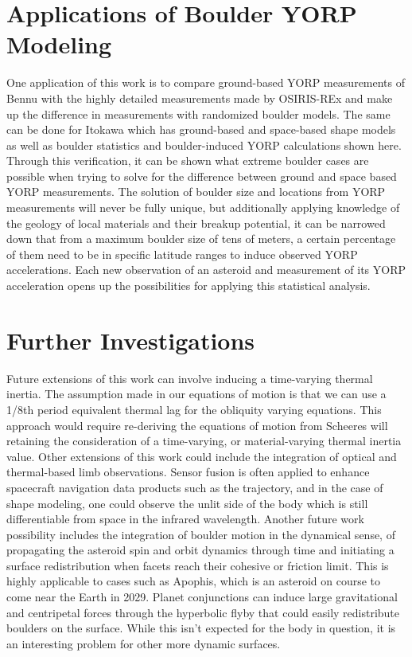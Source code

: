 \section{Applications of Boulder YORP Modeling}
One application of this work is to compare ground-based YORP measurements of Bennu with the highly detailed measurements made by OSIRIS-REx and make up the difference in measurements with randomized boulder models. The same can be done for Itokawa which has ground-based and space-based shape models as well as boulder statistics and boulder-induced YORP calculations shown here. Through this verification, it can be shown what extreme boulder cases are possible when trying to solve for the difference between ground and space based YORP measurements. The solution of boulder size and locations from YORP measurements will never be fully unique, but additionally applying knowledge of the geology of local materials and their breakup potential, it can be narrowed down that from a maximum boulder size of tens of meters, a certain percentage of them need to be in specific latitude ranges to induce observed YORP accelerations. Each new observation of an asteroid and measurement of its YORP acceleration opens up the possibilities for applying this statistical analysis.

\section{Further Investigations}
Future extensions of this work can involve inducing a time-varying thermal inertia. The assumption made in our equations of motion is that we can use a 1/8th period equivalent thermal lag for the obliquity varying equations. This approach would require re-deriving the equations of motion from Scheeres will retaining the consideration of a time-varying, or material-varying thermal inertia value.
Other extensions of this work could include the integration of optical and thermal-based limb observations. Sensor fusion is often applied to enhance spacecraft navigation data products such as the trajectory, and in the case of shape modeling, one could observe the unlit side of the body which is still differentiable from space in the infrared wavelength.
Another future work possibility includes the integration of boulder motion in the dynamical sense, of propagating the asteroid spin and orbit dynamics through time and initiating a surface redistribution when facets reach their cohesive or friction limit. This is highly applicable to cases such as Apophis, which is an asteroid on course to come near the Earth in 2029. Planet conjunctions can induce large gravitational and centripetal forces through the hyperbolic flyby that could easily redistribute boulders on the surface. While this isn't expected for the body in question, it is an interesting problem for other more dynamic surfaces.
